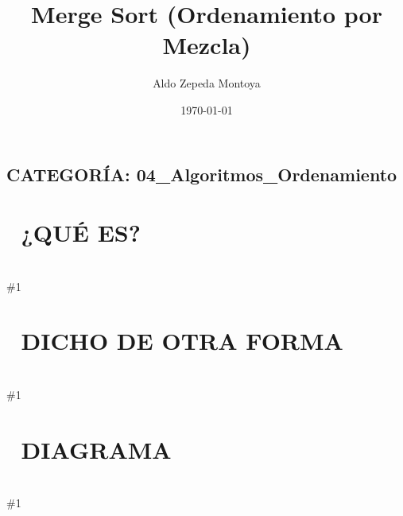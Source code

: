 \documentclass{article}
\newcommand{\quees}[1]{
    \section*{🤔 ¿QUÉ ES?}
    \hrulefill \\
    \#1
}
\newcommand{\dichodeotraforma}[1]{
    \section*{💬 DICHO DE OTRA FORMA}
    \hrulefill \\
    \#1
}
\newcommand{\diagrama}[1]{
    \section*{🎨 DIAGRAMA}
    \hrulefill \\
    \#1
}
\begin{document}
\title{Merge Sort (Ordenamiento por Mezcla)}
\author{Aldo Zepeda Montoya}
\date{\today}
\maketitle

\subsection*{CATEGORÍA: 04\_Algoritmos\_Ordenamiento}

\quees{
Dividir un problema grande con un amigo 🤝. Tienes una pila gigante 
de cartas desordenadas. En lugar de ordenarlas tú solo, le das la 
mitad a tu amigo.

Cada uno ordena su mitad (y si son muchas, vuelven a dividir con 
alguien más). Al final, cuando cada quien tiene su pequeña parte 
ordenada, las fusionan (merge) comparando carta por carta para armar 
la pila final perfecta.

Es un algoritmo basado en la estrategia "Divide y Vencerás" 
(Divide and Conquer).
}

\dichodeotraforma{
Merge Sort es un algoritmo de ordenamiento recursivo, estable y de
comparación. 

Su funcionamiento se basa en dos fases:
1. Divide: Parte el array recursivamente a la mitad hasta llegar a 
   unidades de tamaño 1.
2. Conquer (Merge): Combina los subarrays ordenados para formar uno
   más grande, manteniendo el orden.

A diferencia de Quick Sort, Merge Sort GARANTIZA un tiempo de 
ejecución de O(n log n) incluso en el peor caso posible.
}

\diagrama{\begin{verbatim}
Array inicial: [38, 27, 43, 3]

Divide:
[38, 27]       [43, 3]
[38]  [27]     [43]  [3]

Merge (ordenando al combinar):
[27, 38]       [3, 43]
      \         /
      [3, 27, 38, 43]  <-- ¡Ordenado!
\end{verbatim}}
\end{document}
